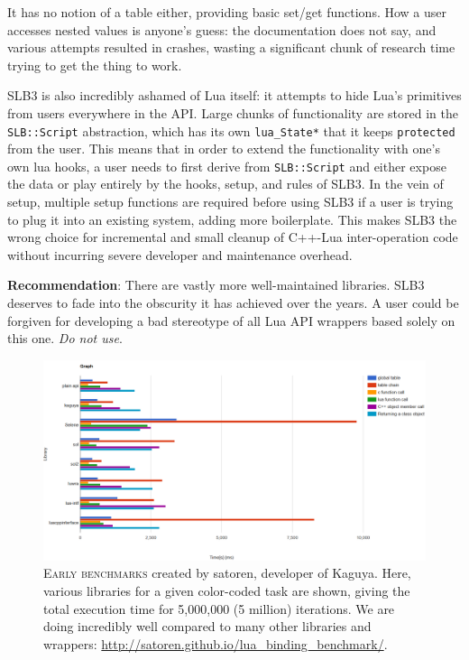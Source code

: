 \documentclass[conference,compsoc]{IEEEtran}
\begin{document}
It has no notion of a table either, providing basic set/get functions. How a user accesses nested values is anyone's guess: the documentation does not say, and various attempts resulted in crashes, wasting a significant chunk of research time trying to get the thing to work.

SLB3 is also incredibly ashamed of Lua itself: it attempts to hide Lua's primitives from users everywhere in the API. Large chunks of functionality are stored in the \lstinline|SLB::Script| abstraction, which has its own \lstinline|lua_State*| that it keeps \lstinline|protected| from the user. This means that in order to extend the functionality with one's own lua hooks, a user needs to first derive from \lstinline|SLB::Script| and either expose the data or play entirely by the hooks, setup, and rules of SLB3. In the vein of setup, multiple setup functions are required before using SLB3 if a user is trying to plug it into an existing system, adding more boilerplate. This makes SLB3 the wrong choice for incremental and small cleanup of C++-Lua inter-operation code without incurring severe developer and maintenance overhead.

\textbf{Recommendation}: There are vastly more well-maintained libraries. SLB3 deserves to fade into the obscurity it has achieved over the years. A user could be forgiven for developing a bad stereotype of all Lua API wrappers based solely on this one. \emph{Do not use}.

\begin{figure}[ht!]
	\includegraphics[width=\textwidth]{early-benchmark}
	\centering
	\caption{\textsc{Early benchmarks} created by satoren, developer of Kaguya. Here, various libraries for a given color-coded task are shown, giving the total execution time for 5,000,000 (5 million) iterations. We are doing incredibly well compared to many other libraries and wrappers: \url{http://satoren.github.io/lua_binding_benchmark/}.}
	\label{fig:early-benchmark}
\end{figure}
\end{document}
